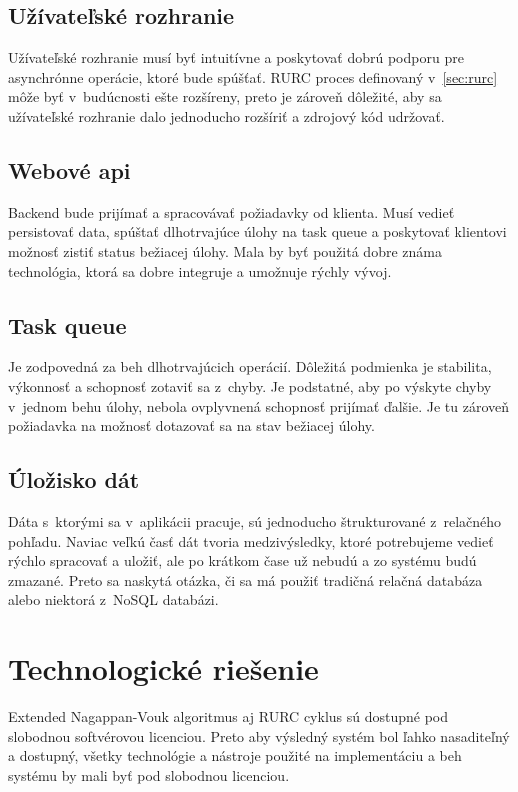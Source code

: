 \subsection{Užívateľské rozhranie}
Užívateľské rozhranie musí byť intuitívne a poskytovať dobrú podporu pre asynchrónne operácie, ktoré bude spúšťať. RURC proces definovaný v~\ref{sec:rurc} môže byť v~budúcnosti ešte rozšíreny, preto je zároveň dôležité, aby sa užívateľské rozhranie dalo jednoducho rozšíriť a zdrojový kód udržovať.

\subsection{Webové api}
Backend bude prijímať a spracovávať požiadavky od klienta. Musí vedieť persistovať data, spúštať dlhotrvajúce úlohy na task queue a poskytovať klientovi možnosť zistiť status bežiacej úlohy. Mala by byť použitá dobre známa technológia, ktorá sa dobre integruje a umožnuje rýchly vývoj.

\subsection{Task queue}
Je zodpovedná za beh dlhotrvajúcich operácií. Dôležitá podmienka je stabilita, výkonnosť a schopnosť zotaviť sa z~chyby. Je podstatné, aby po výskyte chyby v~jednom behu úlohy, nebola ovplyvnená schopnosť prijímať ďalšie. Je tu zároveň požiadavka na možnosť dotazovať sa na stav bežiacej úlohy.

\subsection{Úložisko dát}
Dáta s~ktorými sa v~aplikácii pracuje, sú jednoducho štrukturované z~relačného pohľadu. Naviac veľkú časť dát tvoria medzivýsledky, ktoré potrebujeme vedieť rýchlo spracovať a uložiť, ale po krátkom čase už nebudú a zo systému budú zmazané. Preto sa naskytá otázka, či sa má použiť tradičná relačná databáza alebo niektorá z~NoSQL databázi. 

\section{Technologické riešenie}

Extended Nagappan-Vouk algoritmus aj RURC cyklus sú dostupné pod slobodnou softvérovou licenciou. Preto aby výsledný systém bol ľahko nasaditeľný a dostupný, všetky technológie a nástroje použité na implementáciu a beh systému by mali byť pod slobodnou licenciou.

